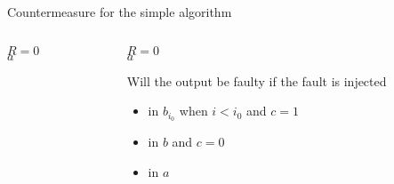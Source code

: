 \begin{frame}{Countermeasure for the simple algorithm}
\begin{columns}[T] %
\begin{column}{.48\textwidth}
{
\setlength{\interspacetitleruled}{0pt}%
\setlength{\algotitleheightrule}{0pt}%
\begin{algorithm}[H]
$R=0$\\
  	\Return $a$
\end{algorithm}
}
\end{column}%
\hfill%
\begin{column}{.55\textwidth}
\begin{algorithm}[H]
$R=0$\\
  	\Return $a$
\caption{Modified algorithm.}
\end{algorithm}
Will the output be faulty if the fault is injected
\begin{itemize}
    \item in $b_{i_0}$ when $i<i_0$ and $c=1$
    \item in $b$ and $c=0$ 
    \item in $a$
\end{itemize}
\end{column}%
\end{columns}
\end{frame}

